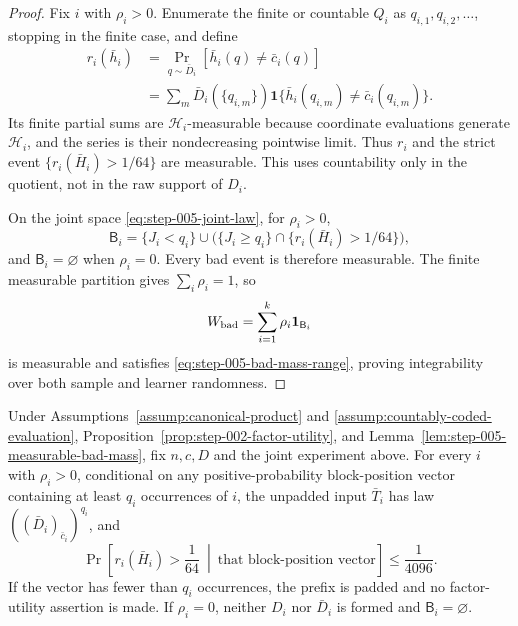 \begin{proof}
Fix \(i\) with \(\rho_i>0\).  Enumerate the finite or countable \(Q_i\)
as \(q_{i,1},q_{i,2},\ldots\), stopping in the finite case, and define
\begin{equation}\label{eq:step-005-factor-risk-map}
\begin{split}
r_i(\bar h_i)
&=\Pr_{q\sim\bar D_i}
  [\bar h_i(q)\ne\bar c_i(q)]\\
&=\sum_m\bar D_i(\{q_{i,m}\})
  \mathbf1\{\bar h_i(q_{i,m})\ne\bar c_i(q_{i,m})\}.
\end{split}
\end{equation}
Its finite partial sums are \(\mathscr H_i\)-measurable because coordinate
evaluations generate \(\mathscr H_i\), and the series is their
nondecreasing pointwise limit.  Thus \(r_i\) and the strict event
\(\{r_i(\bar H_i)>1/64\}\) are measurable.  This uses countability only
in the quotient, not in the raw support of \(D_i\).

On the joint space \eqref{eq:step-005-joint-law}, for \(\rho_i>0\),
\begin{equation}\label{eq:step-005-bad-event}
\mathsf B_i
=\{J_i<q_i\}
 \cup
 \bigl(\{J_i\ge q_i\}
       \cap\{r_i(\bar H_i)>1/64\}\bigr),
\end{equation}
and \(\mathsf B_i=\varnothing\) when \(\rho_i=0\).  Every bad event is
therefore measurable.  The finite measurable partition gives
\(\sum_i\rho_i=1\), so
\begin{equation}\label{eq:step-005-bad-mass-definition}
W_{\rm bad}=\sum_{i=1}^k\rho_i\mathbf1_{\mathsf B_i}
\end{equation}
is measurable and satisfies \eqref{eq:step-005-bad-mass-range}, proving
integrability over both sample and learner randomness.
\end{proof}

\begin{lemma}
\label{lem:step-005-prefix-iid}
Under Assumptions~\ref{assump:canonical-product} and
\ref{assump:countably-coded-evaluation},
Proposition~\ref{prop:step-002-factor-utility}, and
Lemma~\ref{lem:step-005-measurable-bad-mass}, fix \(n,c,D\) and the joint
experiment above.  For every \(i\) with \(\rho_i>0\), conditional on any
positive-probability block-position vector containing at least \(q_i\)
occurrences of \(i\), the unpadded input \(\bar T_i\) has law
\(((\bar D_i)_{\bar c_i})^{q_i}\), and
\begin{equation}\label{eq:step-005-conditional-failure}
\Pr\!\left[r_i(\bar H_i)>\frac1{64}
  \ \middle|\ \text{that block-position vector}\right]
\le\frac1{4096}.
\end{equation}
If the vector has fewer than \(q_i\) occurrences, the prefix is padded and
no factor-utility assertion is made.  If \(\rho_i=0\), neither \(D_i\)
nor \(\bar D_i\) is formed and \(\mathsf B_i=\varnothing\).
\end{lemma}

